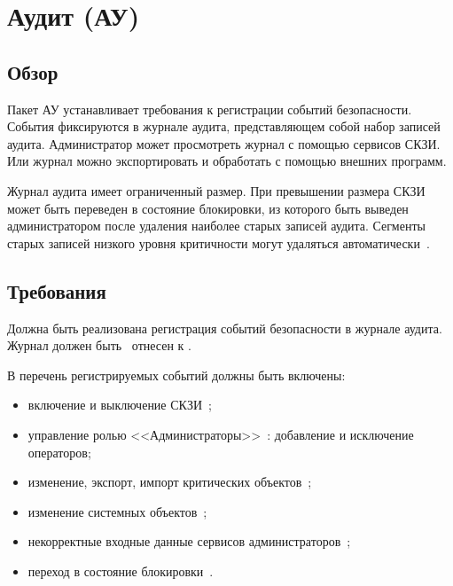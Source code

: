 \section{Аудит (АУ)}\label{AU}

\subsection{Обзор}\label{AU.Defs}

Пакет АУ устанавливает требования к регистрации событий безопасности.
События фиксируются в журнале аудита, представляющем собой набор 
записей аудита.
%
Администратор может просмотреть журнал с помощью сервисов СКЗИ.
Или журнал можно экспортировать и обработать с помощью внешних программ.

Журнал аудита имеет ограниченный размер. При превышении размера
СКЗИ может быть переведен в состояние блокировки, из которого быть
выведен администратором после удаления наиболее старых записей аудита. 
%
Сегменты старых записей низкого уровня критичности могут удаляться 
автоматически~.

\subsection{Требования}\label{AU.Reqs}


\label{R.AU.Log}
Должна быть реализована регистрация событий безопасности в журнале аудита. 
Журнал должен быть~ отнесен к .

\label{R.AU.Events}
В перечень регистрируемых событий должны быть включены:
\begin{itemize} 
\item
включение и выключение СКЗИ~;
\item
управление ролью <<Администраторы>>~: 
добавление и исключение операторов; 
\item
изменение, экспорт, импорт критических объектов~; 
\item
изменение системных объектов~; 
\item
некорректные входные данные сервисов администраторов~;
\item
переход в состояние блокировки~.
\end{itemize}

